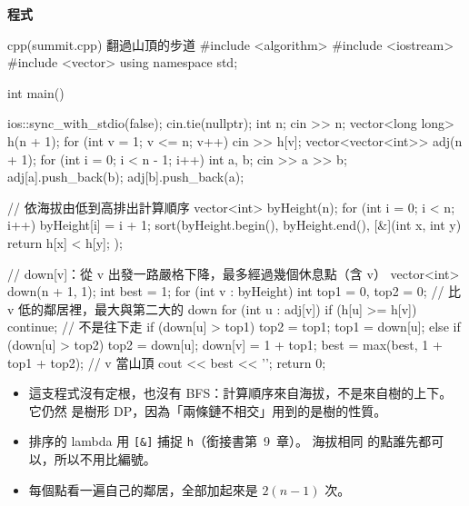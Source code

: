 \textbf{程式}

\begin{example}[label=ex:tdp-summit]{cpp}{(summit.cpp) 翻過山頂的步道}
#include <algorithm>
#include <iostream>
#include <vector>
using namespace std;

int main() {
    ios::sync_with_stdio(false);
    cin.tie(nullptr);
    int n;
    cin >> n;
    vector<long long> h(n + 1);
    for (int v = 1; v <= n; v++) {
        cin >> h[v];
    }
    vector<vector<int>> adj(n + 1);
    for (int i = 0; i < n - 1; i++) {
        int a, b;
        cin >> a >> b;
        adj[a].push_back(b);
        adj[b].push_back(a);
    }

    // 依海拔由低到高排出計算順序
    vector<int> byHeight(n);
    for (int i = 0; i < n; i++) {
        byHeight[i] = i + 1;
    }
    sort(byHeight.begin(), byHeight.end(),
         [&](int x, int y) { return h[x] < h[y]; });

    // down[v]：從 v 出發一路嚴格下降，最多經過幾個休息點（含 v）
    vector<int> down(n + 1, 1);
    int best = 1;
    for (int v : byHeight) {
        int top1 = 0, top2 = 0;             // 比 v 低的鄰居裡，最大與第二大的 down
        for (int u : adj[v]) {
            if (h[u] >= h[v]) {
                continue;                   // 不是往下走
            }
            if (down[u] > top1) {
                top2 = top1;
                top1 = down[u];
            } else if (down[u] > top2) {
                top2 = down[u];
            }
        }
        down[v] = 1 + top1;
        best = max(best, 1 + top1 + top2);  // v 當山頂
    }
    cout << best << '\n';
    return 0;
}
\end{example}


\begin{itemize}
\item 這支程式沒有定根，也沒有 BFS：計算順序來自海拔，不是來自樹的上下。 它仍然
是樹形 DP，因為「兩條鏈不相交」用到的是樹的性質。
\item 排序的 lambda 用 \texttt{[\&]} 捕捉 \texttt{h}（銜接書第~9~章）。 海拔相同
的點誰先都可以，所以不用比編號。
\item 每個點看一遍自己的鄰居，全部加起來是 $2(n - 1)$ 次。
\end{itemize}

